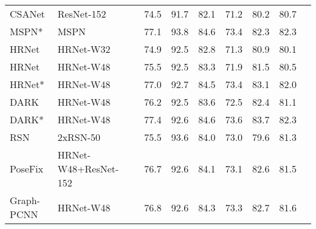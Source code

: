 \documentclass[final]{cvpr}
\begin{document}
\begin{table*}
\begin{center}
\begin{tabular}{l|l|c|lcccccc}
CSANet \cite{CSANet}              & ResNet-152    &    &74.5                  & 91.7             & 82.1          & 71.2          &80.2           &80.7\\
MSPN* \cite{MSPN}                 & MSPN          &    &77.1                  & 93.8             & 84.6          & 73.4          &82.3           &82.3\\
HRNet \cite{HRNet}                & HRNet-W32     &    &74.9                  & 92.5             & 82.8          & 71.3          &80.9           &80.1\\
HRNet \cite{HRNet}                & HRNet-W48     &    &75.5                  & 92.5             & 83.3          & 71.9          &81.5           &80.5\\
HRNet* \cite{HRNet}               & HRNet-W48     &    &77.0                  & 92.7             & 84.5          & 73.4          &83.1           &82.0\\
DARK \cite{DARK}                  & HRNet-W48     &    &76.2                  & 92.5             & 83.6          & 72.5          &82.4           &81.1\\
DARK* \cite{DARK}                 & HRNet-W48     &    &77.4                  & 92.6             & 84.6          & 73.6          &83.7           &82.3\\
RSN \cite{RSN}                   & 2xRSN-50       &    &75.5                  & 93.6             & 84.0          & 73.0          &79.6           &81.3\\
PoseFix \cite{Posefix}    & HRNet-W48+ResNet-152    &  &76.7                  & 92.6             & 84.1          & 73.1          &82.6           &81.5\\
Graph-PCNN \cite{Graph-PCNN}      & HRNet-W48     &    &76.8                  & 92.6             & 84.3          & 73.3          &82.7           &81.6\\


\end{tabular}
\end{center}
\end{table*}
\end{document}
